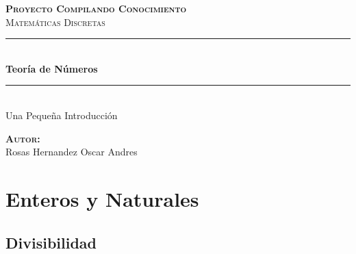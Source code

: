 \documentclass[12pt]{report}                                    %
\author{Oscar Andrés Rosas}                                     %
\begin{document}
\begin{titlepage}

	\center
	\textbf{\textsc{\Large Proyecto Compilando Conocimiento}}\\[1.0cm] 
	\textsc{\Large Matemáticas Discretas}\\[1.0cm] 

	\rule{\linewidth}{0.5mm} \\[1.0cm]
		{ \huge \bfseries Teoría de Números}\\[1.0cm] 
	\rule{\linewidth}{0.5mm} \\[2.0cm]
	
	{\LARGE Una Pequeña Introducción}\\[7cm] 
	
	\begin{center} \large
	\textbf{\textsc{Autor:}}\\
	Rosas Hernandez Oscar Andres
	\end{center}

	\vfill

\end{titlepage}

\tableofcontents{}
\label{sec:Index}

\clearpage










\chapter{Enteros y Naturales}
    \clearpage

    \section{Divisibilidad}
\end{document}

